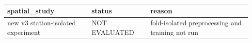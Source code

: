 \begin{tabular}{lll}
\hline
spatial\_study & status & reason \\
\hline
new v3 station-isolated experiment & NOT EVALUATED & fold-isolated preprocessing and training not run \\
\hline
\end{tabular}
